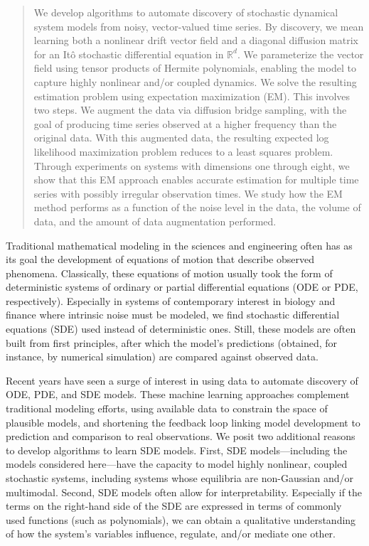 \begin{abstract}
  We develop algorithms to automate discovery of stochastic dynamical system
  models from noisy, vector-valued time series.  By discovery, we mean 
  learning both a nonlinear drift vector field and a diagonal diffusion matrix 
  for an It\^{o} stochastic differential equation in $\mathbb{R}^d$.  We 
  parameterize the vector field using tensor products of Hermite polynomials,
  enabling the model to capture highly nonlinear and/or coupled dynamics.
  We solve the resulting estimation problem using expectation maximization (EM).
  This involves two steps.  We augment the data via diffusion bridge
  sampling, with the goal of producing time series observed at a higher
  frequency than the original data.  With this augmented data,
  the resulting expected log likelihood maximization problem
  reduces to a least squares problem.  Through experiments on systems with 
  dimensions one through eight, we show that this EM approach enables 
  accurate estimation for multiple time series with possibly irregular 
  observation times.  We study how the EM method performs as a function of
  the noise level in the data, the volume of data, and the amount of data
  augmentation performed.  
\end{abstract}

Traditional mathematical modeling in the sciences and engineering often has as its goal the development of equations of motion that describe observed phenomena.  Classically, these equations of motion usually took the form of deterministic systems of ordinary or partial differential equations (ODE or PDE, respectively).  Especially in systems of contemporary interest in biology and finance where intrinsic noise must be modeled, we find stochastic differential equations (SDE) used instead of deterministic ones.  Still, these models are often built from first principles, after which the model's predictions (obtained, for instance, by numerical simulation) are compared against observed data.

Recent years have seen a surge of interest in using data to automate discovery of ODE, PDE, and SDE models.  These machine learning approaches complement traditional modeling efforts, using available data to constrain the space of plausible models, and shortening the feedback loop linking model development to prediction and comparison to real observations.  We posit two additional reasons to develop algorithms to learn SDE models.  First, SDE models---including the models considered here---have the capacity to model highly nonlinear, coupled stochastic systems, including systems whose equilibria are non-Gaussian and/or multimodal.  Second, SDE models often allow for interpretability.  Especially if the terms on the right-hand side of the SDE are expressed in terms of commonly used functions (such as polynomials), we can obtain a qualitative understanding of how the system's variables influence, regulate, and/or mediate one other. 

